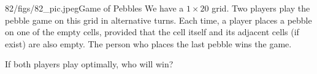 \begin{problem}{82/figs/82_pic.jpeg}{Game of Pebbles} We have a $1 \times 20$ grid. Two players play the pebble game on this grid in alternative turns. Each time, a player places a pebble on one of the empty cells, provided that the cell itself and its adjacent cells (if exist) are also empty. The person who places the last pebble wins the game.
	
If both players play optimally, who will win?
\end{problem}
